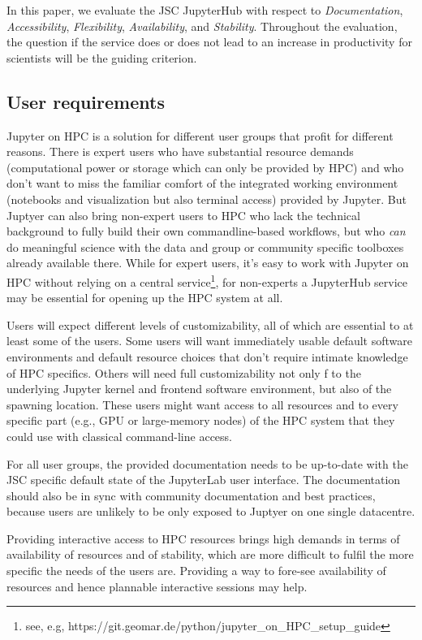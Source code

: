 In this paper, we evaluate the JSC JupyterHub with respect to {\em Documentation}, {\em Accessibility}, {\em Flexibility}, {\em Availability}, and {\em Stability}.
Throughout the evaluation, the question if the service does or does not lead to an increase in productivity for scientists will be the guiding criterion.


\subsection{User requirements}

Jupyter on HPC is a solution for different user groups that profit for different reasons.
There is expert users who have substantial resource demands (computational power or storage which can only be provided by HPC) and who don't want to miss the familiar comfort of the integrated working environment (notebooks and visualization but also terminal access) provided by Jupyter.
But Juptyer can also bring non-expert users to HPC who lack the technical background to fully build their own commandline-based workflows, but who \emph{can} do meaningful science with the data and group or community specific toolboxes already available there.
While for expert users, it's easy to work with Jupyter on HPC without relying on a central service\footnote{see, e.g, https://git.geomar.de/python/jupyter_on_HPC_setup_guide}, for non-experts a JupyterHub service may be essential for opening up the HPC system at all.

Users will expect different levels of customizability, all of which are essential to at least some of the users.
Some users will want immediately usable default software environments and default resource choices that don't require intimate knowledge of HPC specifics.
Others will need full customizability not only f to the underlying Jupyter kernel and frontend software environment, but also of the spawning location.
These users might want access to all resources and to every specific part (e.g., GPU or large-memory nodes) of the HPC system that they could use with classical command-line access.

For all user groups, the provided documentation needs to be up-to-date with the JSC specific default state of the JupyterLab user interface.
The documentation should also be in sync with community documentation and best practices, because users are unlikely to be only exposed to Juptyer on one single datacentre.

Providing interactive access to HPC resources brings high demands in terms of availability of resources and of stability, which are more difficult to fulfil the more specific the needs of the users are.
Providing a way to fore-see availability of resources and hence plannable interactive sessions may help.


